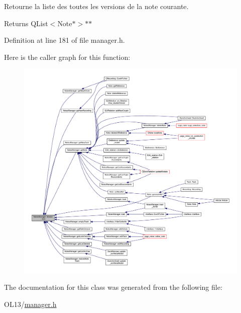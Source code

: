 Retourne la liste des toutes les versions de la note courante. 

\begin{DoxyReturn}{Returns}
Q\+List$<$\+Note$\ast$$>$$\ast$$\ast$ 
\end{DoxyReturn}


Definition at line 181 of file manager.\+h.

Here is the caller graph for this function\+:\nopagebreak
\begin{figure}[H]
\begin{center}
\leavevmode
\includegraphics[width=350pt]{class_notes_manager_1_1_iterator_a99e3eb098c3b5c7b3041731d10a18c88_icgraph}
\end{center}
\end{figure}


The documentation for this class was generated from the following file\+:\begin{DoxyCompactItemize}
\item 
O\+L13/\hyperlink{manager_8h}{manager.\+h}\end{DoxyCompactItemize}
